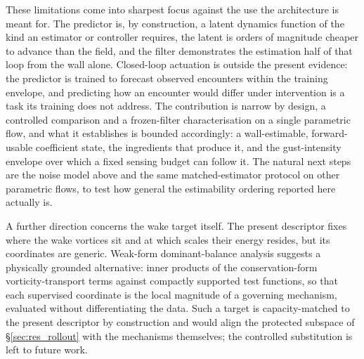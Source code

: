 These limitations come into sharpest focus against the use the architecture is meant for. The predictor is, by construction, a latent dynamics function of the kind an estimator or controller requires, the latent is orders of magnitude cheaper to advance than the field, and the filter demonstrates the estimation half of that loop from the wall alone. Closed-loop actuation is outside the present evidence: the predictor is trained to forecast observed encounters within the training envelope, and predicting how an encounter would differ under intervention is a task its training does not address. The contribution is narrow by design, a controlled comparison and a frozen-filter characterisation on a single parametric flow, and what it establishes is bounded accordingly: a wall-estimable, forward-usable coefficient state, the ingredients that produce it, and the gust-intensity envelope over which a fixed sensing budget can follow it. The natural next steps are the noise model above and the same matched-estimator protocol on other parametric flows, to test how general the estimability ordering reported here actually is.\re

A further direction concerns the wake target itself. The present descriptor fixes where the wake vortices sit and at which scales their energy resides, but its coordinates are generic. Weak-form dominant-balance analysis \citep{ahnert2026} suggests a physically grounded alternative: inner products of the conservation-form vorticity-transport terms against compactly supported test functions, so that each supervised coordinate is the local magnitude of a governing mechanism, evaluated without differentiating the data. Such a target is capacity-matched to the present descriptor by construction and would align the protected subspace of \S\ref{sec:res_rollout} with the mechanisms themselves; the controlled substitution is left to future work.\re

